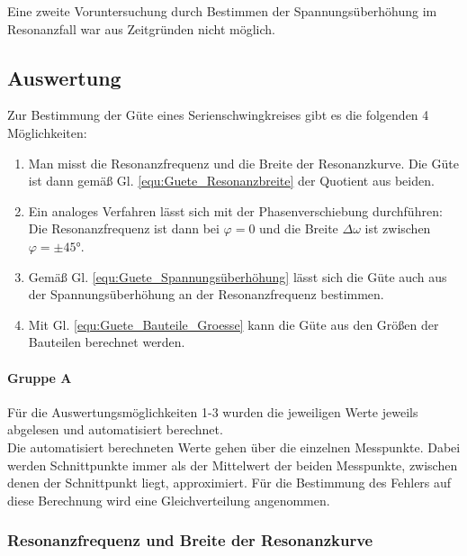 \documentclass[12pt,a4paper]{article}
\begin{document}
Eine zweite Voruntersuchung durch Bestimmen der Spannungsüberhöhung im Resonanzfall war aus Zeitgründen nicht möglich.

\subsection{Auswertung}
Zur Bestimmung der Güte eines Serienschwingkreises gibt es die folgenden 4 Möglichkeiten:
\begin{enumerate}
\item Man misst die Resonanzfrequenz und die Breite der Resonanzkurve. Die Güte ist dann gemäß Gl. \ref{equ:Guete_Resonanzbreite} der Quotient aus beiden.
\item Ein analoges Verfahren lässt sich mit der Phasenverschiebung durchführen: Die Resonanzfrequenz ist dann bei $\varphi = 0$ und die Breite $\Delta \omega$ ist zwischen $\varphi = \pm \ang{45}$.
\item Gemäß Gl. \ref{equ:Guete_Spannungsüberhöhung} lässt sich die Güte auch aus der Spannungsüberhöhung an der Resonanzfrequenz bestimmen.
\item Mit Gl. \ref{equ:Guete_Bauteile_Groesse} kann die Güte aus den Größen der Bauteilen berechnet werden.
\end{enumerate}

\paragraph{Gruppe A}
Für die Auswertungsmöglichkeiten 1-3 wurden die jeweiligen Werte jeweils abgelesen und automatisiert berechnet.\\
Die automatisiert berechneten Werte gehen über die einzelnen Messpunkte. Dabei werden Schnittpunkte immer als der Mittelwert der beiden Messpunkte, zwischen denen der Schnittpunkt liegt, approximiert. Für die Bestimmung des Fehlers auf diese Berechnung wird eine Gleichverteilung angenommen.\\


\subsubsection{Resonanzfrequenz und Breite der Resonanzkurve}
\end{document}
